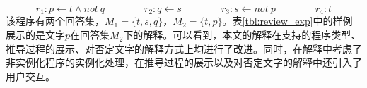 $$r_1: p \leftarrow t \land not\ q \qquad\qquad r_2: q \leftarrow s \qquad\qquad r_3: s \leftarrow not\ p \qquad\qquad r_4: t$$%
该程序有两个回答集，$M_1=\{t,s,q\}$，$M_2=\{t, p\}$。表\ref{tbl:review_exp}中的样例展示的是文字$p$在回答集$M_2$下的解释。可以看到，本文的解释在支持的程序类型、推导过程的展示、对否定文字的解释方式上均进行了改进。同时，在解释中考虑了非实例化程序的实例化处理，在推导过程的展示以及对否定文字的解释中还引入了用户交互。
\begin{table}
    \caption{已有一致性程序解释工作总结与本文对比}\label{tbl:review_exp}
    \begin{adjustbox}{scale=0.55,center}
    \centering
    \semiLarge
\end{adjustbox}
\end{table}
